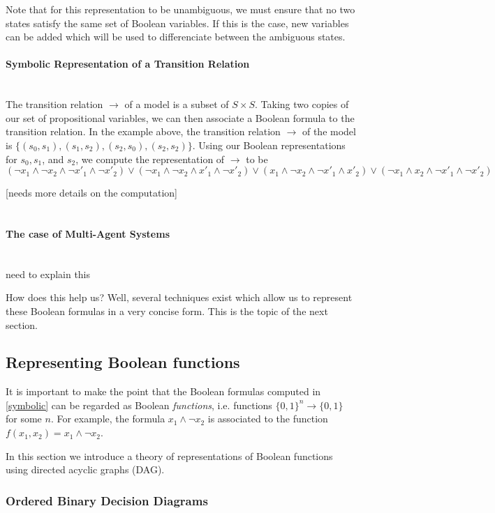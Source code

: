 \documentclass[12]{article}
\newcommand{\myparagraph}[1]{\paragraph{#1}\mbox{}\\}
\begin{document}
Note that for this representation to be unambiguous, we must ensure that no two states satisfy the same set of Boolean variables. If this is the case, new variables can be added which will be used to differenciate between the ambiguous states.

\myparagraph{Symbolic Representation of a Transition Relation}

The transition relation $\rightarrow$ of a model is a subset of $S \times S$. Taking two copies of our set of propositional variables, we can then associate a Boolean formula to the transition relation. In the example above, the transition relation $\rightarrow$ of the model is $\{(s_0, s_1), (s_1, s_2), (s_2, s_0), (s_2, s_2)\}$. 
Using our Boolean representations for $s_0, s_1$, and $s_2$, we compute the representation of $\rightarrow$ to be $$(\lnot x_1 \land \lnot x_2 \land \lnot x'_1 \land \lnot x'_2 ) \lor (\lnot x_1 \land \lnot x_2 \land x'_1 \land \lnot x'_2 ) \lor ( x_1 \land \lnot x_2 \land \lnot x'_1 \land  x'_2 ) \lor (\lnot x_1 \land x_2 \land \lnot x'_1 \land \lnot x'_2 )$$

[needs more details on the computation]\\\\

\myparagraph{The case of Multi-Agent Systems}

need to explain this

How does this help us? Well, several techniques exist which allow us to represent these Boolean formulas in a very concise form. This is the topic of the next section.

\subsection{Representing Boolean functions}

It is important to make the point that the Boolean formulas computed in \ref{symbolic} can be regarded as Boolean \textit{functions}, i.e. functions $\{0, 1\}^n \rightarrow \{0, 1\}$ for some $n$. For example, the formula $x_1 \land \lnot x_2$ is associated to the function $f(x_1, x_2) = x_1 \land \lnot x_2$.

In this section we introduce a theory of representations of Boolean functions using directed acyclic graphs (DAG). 

\subsubsection{Ordered Binary Decision Diagrams}
\end{document}
